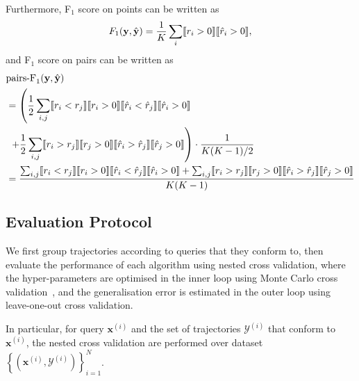 Furthermore, F$_1$ score on points can be written as
\begin{equation*}
F_1(\mathbf{y}, \hat{\mathbf{y}}) = \frac{1}{K} \sum_i \llbracket r_i > 0 \rrbracket  \llbracket \hat{r}_i > 0 \rrbracket,
\end{equation*}
and F$_1$ score on pairs can be written as
\begin{align*}
& \text{pairs-F}_1(\mathbf{y}, \hat{\mathbf{y}}) \\
&= \left( \frac{1}{2} \sum_{i,j} \llbracket r_i < r_j \rrbracket  \llbracket r_i > 0 \rrbracket \llbracket \hat{r}_i < \hat{r}_j \rrbracket  \llbracket \hat{r}_i > 0 \rrbracket \right. \\
&  \left. ~+ \frac{1}{2} \sum_{i,j} \llbracket r_i > r_j \rrbracket  \llbracket r_j > 0 \rrbracket \llbracket \hat{r}_i > \hat{r}_j \rrbracket  \llbracket \hat{r}_j > 0 \rrbracket \right)
   \cdot \frac{1}{K(K-1)/2} \\
&= \frac{\sum_{i,j} \llbracket r_i < r_j \rrbracket  \llbracket r_i > 0 \rrbracket \llbracket \hat{r}_i < \hat{r}_j \rrbracket  \llbracket \hat{r}_i > 0 \rrbracket +
         \sum_{i,j} \llbracket r_i > r_j \rrbracket  \llbracket r_j > 0 \rrbracket \llbracket \hat{r}_i > \hat{r}_j \rrbracket  \llbracket \hat{r}_j > 0 \rrbracket} 
        {K(K-1)}
\end{align*}



\subsection{Evaluation Protocol}
\label{sec:protocol}

We first group trajectories according to queries that they conform to,
then evaluate the performance of each algorithm using nested cross validation,
where the hyper-parameters are optimised in the inner loop using Monte Carlo cross validation~\cite{burman1989comparative},
and the generalisation error is estimated in the outer loop using leave-one-out cross validation.

In particular, for query $\mathbf{x}^{(i)}$ and the set of trajectories $\mathcal{Y}^{(i)}$ that conform to $\mathbf{x}^{(i)}$,
the nested cross validation are performed over dataset $\left\{(\mathbf{x}^{(i)}, \mathcal{Y}^{(i)})\right\}_{i=1}^N$.

